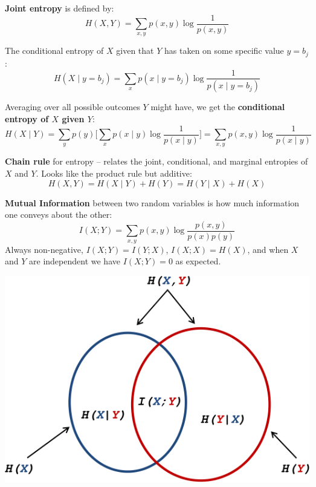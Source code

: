 \documentclass[a4paper, 11pt]{article}
\begin{document}
{    \textbf{Joint entropy} is defined by:
    \[H(X,Y) = \sum_{x,y}{p(x,y)\log\frac{1}{p(x,y)}}\]

    The conditional entropy of \(X\) given that \(Y\) has taken on some specific value \(y = b_j\):
    \[H(X \mid y = b_j) = \sum_x{p(x \mid y=b_j) \log\frac{1}{p(x \mid y=b_j)}}\]

    Averaging over all possible outcomes \(Y\) might have, we get the \textbf{conditional entropy of \(X\) given \(Y\)}:
    \[H(X \mid Y) = \sum_y{ p(y) \Bigg[ \sum_x{p(x \mid y)\log\frac{1}{p(x \mid y)}} \Bigg] } = \sum_{x,y}{p(x,y)\log\frac{1}{p(x \mid y)}}\]

    \begin{minipage}[t]{0.6\textwidth}
    \textbf{Chain rule} for entropy -- relates the joint, conditional, and marginal entropies of \(X\) and \(Y\). Looks like the product rule but additive:
    \[H(X,Y) = H(X \mid Y) + H(Y) = H(Y \mid X) + H(X)\]

    \textbf{Mutual Information} between two random variables is how much information one conveys about the other:
    \[I(X;Y) = \sum_{x,y}{p(x,y)\log\frac{p(x,y)}{p(x)p(y)}}\]
    Always non-negative, \(I(X;Y) = I(Y;X)\), \(I(X;X) = H(X)\), and when \(X\) and \(Y\) are independent we have \(I(X;Y) = 0\) as expected.

    \end{minipage}
    \begin{minipage}[t]{0.35\textwidth}
    \vspace{0pt}
    \centering
    \includegraphics[width=\textwidth]{information-venn.png}
    \end{minipage}
}
\end{document}
